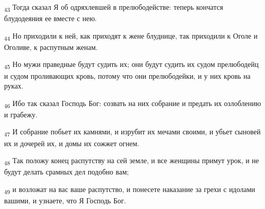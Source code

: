 \begin{tcolorbox}
\textsubscript{43} Тогда сказал Я об одряхлевшей в прелюбодействе: теперь кончатся блудодеяния ее вместе с нею.
\end{tcolorbox}
\begin{tcolorbox}
\textsubscript{44} Но приходили к ней, как приходят к жене блуднице, так приходили к Оголе и Оголиве, к распутным женам.
\end{tcolorbox}
\begin{tcolorbox}
\textsubscript{45} Но мужи праведные будут судить их; они будут судить их судом прелюбодейц и судом проливающих кровь, потому что они прелюбодейки, и у них кровь на руках.
\end{tcolorbox}
\begin{tcolorbox}
\textsubscript{46} Ибо так сказал Господь Бог: созвать на них собрание и предать их озлоблению и грабежу.
\end{tcolorbox}
\begin{tcolorbox}
\textsubscript{47} И собрание побьет их камнями, и изрубит их мечами своими, и убьет сыновей их и дочерей их, и домы их сожжет огнем.
\end{tcolorbox}
\begin{tcolorbox}
\textsubscript{48} Так положу конец распутству на сей земле, и все женщины примут урок, и не будут делать срамных дел подобно вам;
\end{tcolorbox}
\begin{tcolorbox}
\textsubscript{49} и возложат на вас ваше распутство, и понесете наказание за грехи с идолами вашими, и узнаете, что Я Господь Бог.
\end{tcolorbox}
